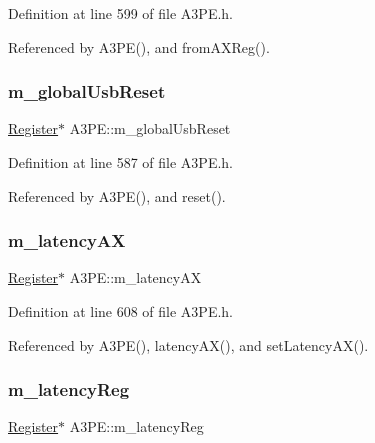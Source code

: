 Definition at line 599 of file A3\+P\+E.\+h.



Referenced by A3\+P\+E(), and from\+A\+X\+Reg().

\mbox{\label{classA3PE_abd71e0c273f9e211e1a9302019129aff}} 
\subsubsection{\texorpdfstring{m\+\_\+global\+Usb\+Reset}{m\_globalUsbReset}}
{\footnotesize\ttfamily \hyperlink{classRegister}{Register}$\ast$ A3\+P\+E\+::m\+\_\+global\+Usb\+Reset\hspace{0.3cm}{\ttfamily [private]}}



Definition at line 587 of file A3\+P\+E.\+h.



Referenced by A3\+P\+E(), and reset().

\mbox{\label{classA3PE_a061472eb539bb6ac99f4fa11a760eeaf}} 
\subsubsection{\texorpdfstring{m\+\_\+latency\+AX}{m\_latencyAX}}
{\footnotesize\ttfamily \hyperlink{classRegister}{Register}$\ast$ A3\+P\+E\+::m\+\_\+latency\+AX\hspace{0.3cm}{\ttfamily [private]}}



Definition at line 608 of file A3\+P\+E.\+h.



Referenced by A3\+P\+E(), latency\+A\+X(), and set\+Latency\+A\+X().

\mbox{\label{classA3PE_a96a167e73e264da5a18d9ddb5ebb5f23}} 
\subsubsection{\texorpdfstring{m\+\_\+latency\+Reg}{m\_latencyReg}}
{\footnotesize\ttfamily \hyperlink{classRegister}{Register}$\ast$ A3\+P\+E\+::m\+\_\+latency\+Reg\hspace{0.3cm}{\ttfamily [private]}}



